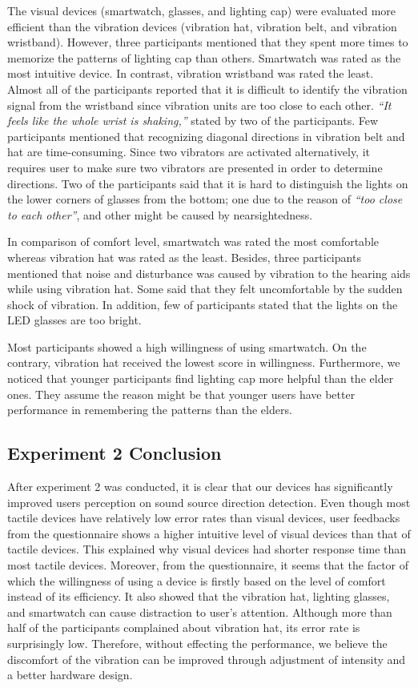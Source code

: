 \documentclass{sigchi}
\begin{document}
The visual devices (smartwatch, glasses, and lighting cap) were evaluated more efficient than the vibration devices (vibration hat, vibration belt, and vibration wristband). However, three participants mentioned that they spent more times to memorize the patterns of lighting cap than others. Smartwatch was rated as the most intuitive device. In contrast, vibration wristband was rated the least. Almost all of the participants reported that it is difficult to identify the vibration signal from the wristband since vibration units are too close to each other. \textit{\textquotedblleft It feels like the whole wrist is shaking,\textquotedblright} stated by two of the participants. Few participants mentioned that recognizing diagonal directions in vibration belt and hat are time-consuming. Since two vibrators are activated alternatively, it requires user to make sure two vibrators are presented in order to determine directions. Two of the participants said that it is hard to distinguish the lights on the lower corners of glasses from the bottom; one due to the reason of \textit{\textquotedblleft too close to each other\textquotedblright}, and other might be caused by nearsightedness.

In comparison of comfort level, smartwatch was rated the most comfortable whereas vibration hat was rated as the least. Besides, three participants mentioned that noise and disturbance was caused by vibration to the hearing aids while using vibration hat. Some said that they felt uncomfortable by the sudden shock of vibration. In addition, few of participants stated that the lights on the LED glasses are too bright.

Most participants showed a high willingness of using smartwatch. On the contrary, vibration hat received the lowest score in willingness. Furthermore, we noticed that younger participants find lighting cap more helpful than the elder ones. They assume the reason might be that younger users have better performance in remembering the patterns than the elders.

\subsection{Experiment 2 Conclusion}
After experiment 2 was conducted, it is clear that our devices has significantly improved users perception on sound source direction detection. Even though most tactile devices have relatively low error rates than visual devices, user feedbacks from the questionnaire shows a higher intuitive level of visual devices than that of tactile devices. This explained why visual devices had shorter response time than most tactile devices. Moreover, from the questionnaire, it seems that the factor of which the willingness of using a device is firstly based on the level of comfort instead of its efficiency. It also showed that the vibration hat, lighting glasses, and smartwatch can cause distraction to user's attention. Although more than half of the participants complained about vibration hat, its error rate is surprisingly low. Therefore, without effecting the performance, we believe the discomfort of the vibration can be improved through adjustment of intensity and a better hardware design.
\end{document}
